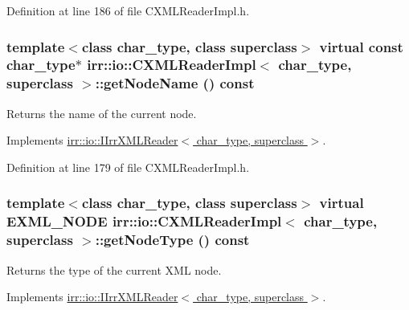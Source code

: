 Definition at line 186 of file CXMLReaderImpl.h.\hypertarget{classirr_1_1io_1_1_c_x_m_l_reader_impl_30ddc03ee634ed0dbeef25547677f2da}{
\subsubsection[{getNodeName}]{\setlength{\rightskip}{0pt plus 5cm}template$<$class char\_\-type, class superclass$>$ virtual const char\_\-type$\ast$ {\bf irr::io::CXMLReaderImpl}$<$ char\_\-type, {\bf superclass} $>$::getNodeName () const}}
\label{classirr_1_1io_1_1_c_x_m_l_reader_impl_30ddc03ee634ed0dbeef25547677f2da}


Returns the name of the current node. 



Implements \hyperlink{classirr_1_1io_1_1_i_irr_x_m_l_reader_7d745b130c895d0f910f191d04e20e87}{irr::io::IIrrXMLReader$<$ char\_\-type, superclass $>$}.

Definition at line 179 of file CXMLReaderImpl.h.\hypertarget{classirr_1_1io_1_1_c_x_m_l_reader_impl_307110843c6946fa862da1f46244aecd}{
\subsubsection[{getNodeType}]{\setlength{\rightskip}{0pt plus 5cm}template$<$class char\_\-type, class superclass$>$ virtual {\bf EXML\_\-NODE} {\bf irr::io::CXMLReaderImpl}$<$ char\_\-type, {\bf superclass} $>$::getNodeType () const}}
\label{classirr_1_1io_1_1_c_x_m_l_reader_impl_307110843c6946fa862da1f46244aecd}


Returns the type of the current XML node. 



Implements \hyperlink{classirr_1_1io_1_1_i_irr_x_m_l_reader_3482e8e6bdc15965fc6a0bcef6e9a8e0}{irr::io::IIrrXMLReader$<$ char\_\-type, superclass $>$}.

